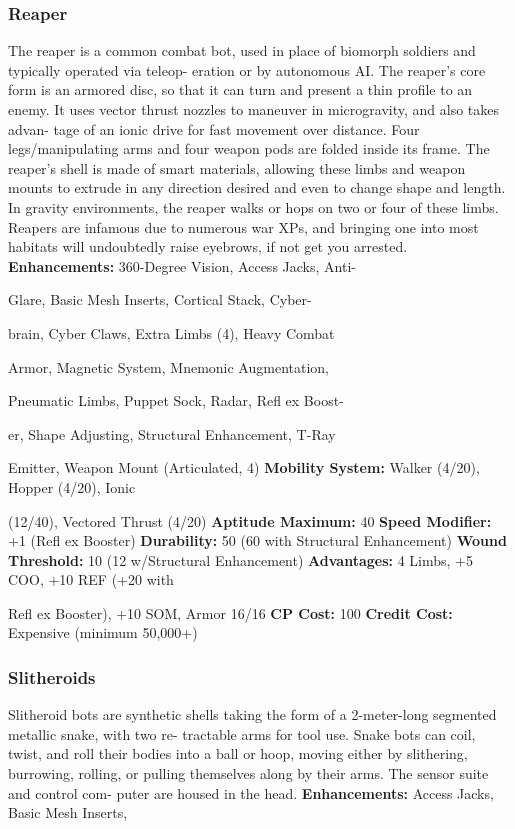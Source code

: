 \subsubsection{Reaper}

The reaper is a common combat bot, used in place of 
biomorph soldiers and typically operated via teleop-
eration or by autonomous AI. The reaper's core form 
is an armored disc, so that it can turn and present a 
thin profile to an enemy. It uses vector thrust nozzles 
to maneuver in microgravity, and also takes advan-
tage of an ionic drive for fast movement over distance. 
Four legs/manipulating arms and four weapon pods 
are folded inside its frame. The reaper's shell is made 
of smart materials, allowing these limbs and weapon 
mounts to extrude in any direction desired and even 
to change shape and length. In gravity environments, 
the reaper walks or hops on two or four of these limbs. 
Reapers are infamous due to numerous war XPs, and 
bringing one into most habitats will undoubtedly raise 
eyebrows, if not get you arrested.
\textbf{Enhancements:} 360-Degree Vision, Access Jacks, Anti-

Glare, Basic Mesh Inserts, Cortical Stack, Cyber-

brain, Cyber Claws, Extra Limbs (4), Heavy Combat 

Armor, Magnetic System, Mnemonic Augmentation, 

Pneumatic Limbs, Puppet Sock, Radar, Refl ex Boost-

er, Shape Adjusting, Structural Enhancement, T-Ray 

Emitter, Weapon Mount (Articulated, 4)
\textbf{Mobility System:} Walker (4/20), Hopper (4/20), Ionic 

(12/40), Vectored Thrust (4/20)
\textbf{Aptitude Maximum: }40
\textbf{Speed Modifier: }+1 (Refl ex Booster)
\textbf{Durability:} 50 (60 with Structural Enhancement)
\textbf{Wound Threshold: }10 (12 w/Structural Enhancement)
\textbf{Advantages: }4 Limbs, +5 COO, +10 REF (+20 with 

Refl ex Booster), +10 SOM, Armor 16/16
\textbf{CP Cost: }100
\textbf{Credit Cost: }Expensive (minimum 50,000+)

\subsubsection{Slitheroids}

Slitheroid bots are synthetic shells taking the form of 
a 2-meter-long segmented metallic snake, with two re-
tractable arms for tool use. Snake bots can coil, twist, 
and roll their bodies into a ball or hoop, moving either 
by slithering, burrowing, rolling, or pulling themselves 
along by their arms. The sensor suite and control com-
puter are housed in the head.
\textbf{Enhancements:} Access Jacks, Basic Mesh Inserts, 

